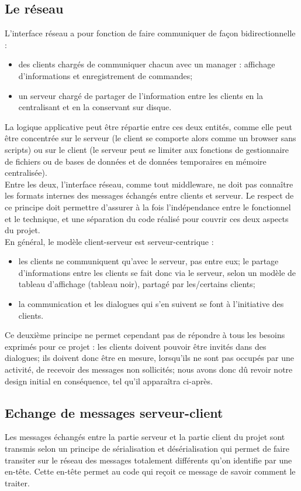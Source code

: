 \documentclass[a4paper,titlepage]{scrreprt}
\begin{document}
\subsection{Le réseau}
  L'interface réseau a pour fonction de faire communiquer de façon bidirectionnelle :
\begin{itemize}
  \item des clients chargés de communiquer chacun avec un manager : affichage d'informations et enregistrement de commandes;
  \item un serveur chargé de partager de l'information entre les clients en la centralisant et en la conservant sur disque.
\end{itemize}
La logique applicative peut être répartie entre ces deux entités, comme elle peut être concentrée sur le serveur (le client se comporte alors comme un browser sans scripts) ou sur le client (le serveur peut se limiter aux fonctions de gestionnaire de fichiers ou de bases de données et de données temporaires en mémoire centralisée).\\
Entre les deux, l'interface réseau, comme tout middleware, ne doit pas connaître les formats internes des messages échangés entre clients et serveur. Le respect de ce principe doit permettre d'assurer à la fois l'indépendance entre le fonctionnel et le technique, et une séparation du code réalisé pour couvrir ces deux aspects du projet.\\
En général, le modèle client-serveur \cite{Bulfone} est serveur-centrique :
\begin{itemize}
  \item les clients ne communiquent qu'avec le serveur, pas entre eux; le partage d'informations entre les clients
  se fait donc via le serveur, selon un modèle de tableau d'affichage (tableau noir), partagé par les/certains clients;
  \item la communication et les dialogues qui s'en suivent se font à l'initiative des clients.
\end{itemize}
Ce deuxième principe ne permet cependant pas de répondre à tous les besoins exprimés pour ce projet :
les clients doivent pouvoir être invités dans des dialogues; ils doivent donc être en mesure,
lorsqu'ils ne sont pas occupés par une activité, de recevoir des messages non sollicités;
nous avons donc dû revoir notre design initial en conséquence, tel qu'il apparaîtra ci-après.\\
\subsection{Echange de messages serveur-client}
Les messages échangés entre la partie serveur et la partie client du projet sont transmis selon un principe de sérialisation et désérialisation qui permet de faire transiter sur le réseau des messages totalement différents qu'on identifie par une en-tête. Cette en-tête permet au code qui reçoit ce message de savoir comment le traiter.
\end{document}
